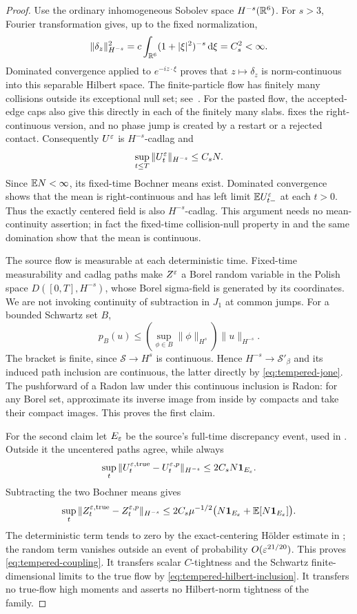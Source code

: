 \begin{proof}
Use the ordinary inhomogeneous Sobolev space $H^{-s}(\mathbb R^6)$.
For $s>3$, Fourier transformation gives, up to the fixed normalization,
\[
 \|\delta_z\|_{H^{-s}}^2
      =c\int_{\mathbb R^6}(1+|\xi|^2)^{-s}\,\mathrm d\xi=C_s^2<\infty.
\]
Dominated convergence applied to $e^{-iz\cdot\xi}$ proves that
$z\mapsto\delta_z$ is norm-continuous into this separable Hilbert space.
The finite-particle flow has finitely many collisions outside its
exceptional null set; see~\cite[Proposition 1.2 and Proposition 4.5]{DHM}.
For the pasted flow, the accepted-edge caps also give this directly
in each of the finitely many slabs.  fixes the
right-continuous version, and no phase jump is created by a restart
or a rejected contact. Consequently $U^\varepsilon$ is $H^{-s}$-cadlag and
\[
             \sup_{t\leq T}\|U_t^\varepsilon\|_{H^{-s}}\leq C_sN.
\]
Since $\mathbb E N<\infty$, its fixed-time Bochner means exist.
Dominated convergence shows that the mean is right-continuous and
has left limit $\mathbb E U_{t-}^\varepsilon$ at each $t>0$.
Thus the exactly centered field is also $H^{-s}$-cadlag.
This argument needs no mean-continuity assertion; in fact the
fixed-time collision-null property in  and the
same domination show that the mean is continuous.

The source flow is measurable at each deterministic time.
Fixed-time measurability and cadlag paths make $Z^\varepsilon$ a Borel
random variable in the Polish space $D([0,T],H^{-s})$, whose Borel
sigma-field is generated by its coordinates.
We are not invoking continuity of subtraction in $J_1$ at common jumps.
For a bounded Schwartz set $B$,
\begin{equation}\label{eq:tempered-hilbert-inclusion}
 p_B(u)\leq
 \left(\sup_{\phi\in B}\|\phi\|_{H^s}\right)\|u\|_{H^{-s}}.
\end{equation}
The bracket is finite, since $\mathcal S\to H^s$ is continuous.
Hence $H^{-s}\to\mathcal S'_\beta$ and its induced path inclusion
are continuous, the latter directly by \eqref{eq:tempered-jone}.
The pushforward of a Radon law under this continuous inclusion is
Radon: for any Borel set, approximate its inverse image from inside
by compacts and take their compact images. This proves the first claim.

For the second claim let $E_\varepsilon$ be the source's full-time discrepancy
event, used in . Outside it the uncentered paths
agree, while always
\[
 \sup_t\|U_t^{\varepsilon,\mathrm{true}}-U_t^{\varepsilon,p}\|_{H^{-s}}
        \leq2C_sN\mathbf1_{E_\varepsilon}.
\]
Subtracting the two Bochner means gives
\[
 \sup_t\|Z_t^{\varepsilon,\mathrm{true}}-Z_t^{\varepsilon,p}\|_{H^{-s}}
 \leq2C_s\mu^{-1/2}
       \bigl(N\mathbf1_{E_\varepsilon}+\mathbb E[N\mathbf1_{E_\varepsilon}]\bigr).
\]
The deterministic term tends to zero by the exact-centering
H\"older estimate in ; the random term vanishes
outside an event of probability $O(\varepsilon^{21/20})$.
This proves \eqref{eq:tempered-coupling}.
It transfers scalar $C$-tightness and the Schwartz finite-dimensional
limits to the true flow by \eqref{eq:tempered-hilbert-inclusion}.
It transfers no true-flow high moments and asserts no Hilbert-norm
tightness of the family.
\end{proof}

